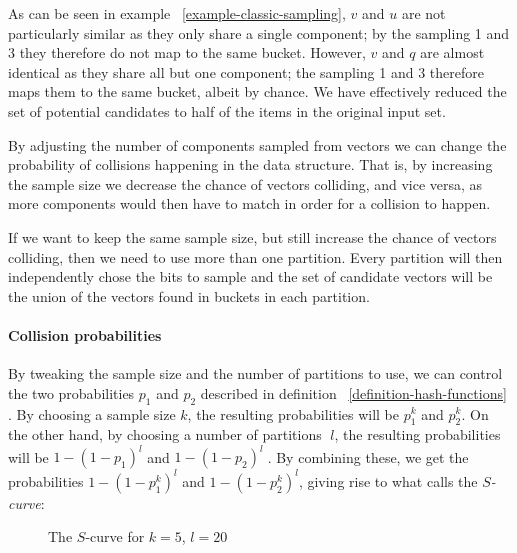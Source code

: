 As can be seen in example ~\ref{example-classic-sampling}, $v$ and $u$ are not particularly similar as they only share a single component; by the sampling 1 and 3 they therefore do not map to the same bucket. However, $v$ and $q$ are almost identical as they share all but one component; the sampling 1 and 3 therefore maps them to the same bucket, albeit by chance. We have effectively reduced the set of potential candidates to half of the items in the original input set.

By adjusting the number of components sampled from vectors we can change the probability of collisions happening in the data structure. That is, by increasing the sample size we decrease the chance of vectors colliding, and vice versa, as more components would then have to match in order for a collision to happen.

If we want to keep the same sample size, but still increase the chance of vectors colliding, then we need to use more than one partition. Every partition will then independently chose the bits to sample and the set of candidate vectors will be the union of the vectors found in buckets in each partition.

\paragraph{Collision probabilities} By tweaking the sample size and the number of partitions to use, we can control the two probabilities $p_1$ and $p_2$ described in definition ~\ref{definition-hash-functions} \cite[p. 101]{DBLP:books/cu/LeskovecRU14}. By choosing a sample size $k$, the resulting probabilities will be $p_1^k$ and  $p_2^k$. On the other hand, by choosing a number of partitions 􏰄$l$, the resulting probabilities will be $1 - (1 - p_1)^l$ and $1 - (1 - p_2)^l􏰅$. By combining these, we get the probabilities $1 - (1 - p_1^k)^l$ and $1 - (1 - p_2^k)^l$, giving rise to what \cite[p. 89]{DBLP:books/cu/LeskovecRU14} calls the \textit{$S$-curve}:

\begin{figure}[ht]

  \caption{The $S$-curve for $k = 5$, $l = 20$}
\end{figure}


